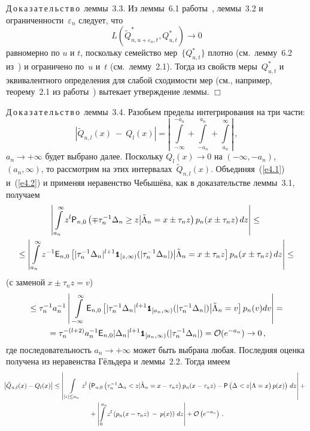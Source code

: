\smallskip

\noindent
Д\,о\,к\,а\,з\,а\,т\,е\,л\,ь\,с\,т\,в\,о~леммы~3.3.
Из леммы~6.1 работы~\cite{8ben}, леммы~3.2 и ограниченности~$\varepsilon_n$ следует, что
$$
L(\tilde Q_{n,u+\varepsilon_n,t}^{*}, Q_{u,t}^{*})\rightarrow 0
$$
равномерно по $u$ и $t$, поскольку семейство мер~$\{ Q_{u,t}^{*} \}$ плотно (см.\ лемму~6.2 из~\cite{2ben}) 
и ограничено по~$u$ и~$t$ (см.\ лемму~2.1). Тогда из свойств меры~$Q_{u,t}^{*}$ и эквивалентного 
определения для слабой сходимости мер (см., например, теорему~2.1 из работы~\cite{9ben}) вытекает утверждение леммы.
\hfill$\Box$

\smallskip

\noindent
Д\,о\,к\,а\,з\,а\,т\,е\,л\,ь\,с\,т\,в\,о~леммы~3.4. Разобьем пределы интегрирования на
три части:
$$
\left|\tilde Q_{n,l}(x)\:-\: Q_{l}(x) \right|=\left|\,\, \int\limits_{-\infty}^{-a_n}+\int\limits_{-a_n}^{a_n}
+\int\limits_{a_n}^{\infty} \right|\,,
$$
$a_n\rightarrow+\infty$ будет выбрано далее. Поскольку $Q_{l}(x)\rightarrow0$ 
на $(-\infty,-a_n)$, $(a_n,\infty)$, то рассмотрим на этих интервалах~$\tilde Q_{n,l}(x)$. 
Объединяя~(\ref{e4.1}) и~(\ref{e4.2}) и применяя неравенство Чебышёва, как в доказательстве леммы~3.1, получаем
\begin{multline*}
\left|\,\int\limits_{a_n}^{\infty} z^{l} {{\sf P}}_{n,0}\left(
\mp\tau_n^{-1}\Delta_n \geq z\big| \tilde\Lambda_n=x\pm\tau_nz\right)p_n(x\pm\tau_nz)\,dz\right|\leq{}
\\
{}
\leq\left|\, \int\limits_{a_n}^{\infty} z^{-1}
{{\sf E}}_{n,0}\left[|\tau_n^{-1}\Delta_n|^{l+1} {\mbox{{\small \tt {1}}\hspace{-1.5mm}{\tt 1}}}_{[z,\infty)}(|\tau_n^{-1}\Delta_n|)
\big| \tilde\Lambda_n=x\pm\tau_nz\right]p_n(x\pm\tau_nz)\,dz\right|\leq{}\\
\end{multline*}
(с заменой $x\pm\tau_nz=v$)
\begin{multline*}
{}\leq\tau_n^{-1}a_n^{-1}\left|\,\, \int\limits_{-\infty}^{\infty}
{{\sf E}}_{n,0}\left[|\tau_n^{-1}\Delta_n|^{l+1} {\mbox{{\small \tt {1}}\hspace{-1.5mm}{\tt 1}}}_{[a_n,\infty)}(|\tau_n^{-1}\Delta_n|)
\big| \tilde\Lambda_n=v\right]p_n(v)dv\right|={}\\
{}=\tau_n^{-(l+2)}a_n^{-1}{{\sf E}}_{n,0}|\Delta_n|^{l+1}{\mbox{{\small \tt {1}}\hspace{-1.5mm}{\tt 1}}}_{[a_n,\infty)}
(|\tau_n^{-1}\Delta_n|)={\cal O}(e^{-a_n})\rightarrow 0\,,
\end{multline*}
где последовательность $a_n\rightarrow+\infty$ может быть выбрана любая. Последняя оценка получена из 
неравенства Гёльдера и леммы~2.2.
Тогда имеем
\begin{multline*}
\!\!\left|\tilde Q_{n,l}(x)- Q_{l}(x) \right|\leq
\left|\, \int\limits_{|z|\leq a_n} z^{l}\left( {{\sf P}}_{n,0}\left(\tau_n^{-1}\Delta_n < 
z\vert \tilde\Lambda_n=x-\tau_nz\right)p_n(x-\tau_nz)-
{{\sf P}}\left(\Delta < z\big| \Lambda=x\right)p(x)\right)\,dz \right|+{}\\
{}
+\left| \int\limits_{0}^{a_n} z^{l}\left( p_n(x-\tau_nz)\:-\:p(x)\right)\,dz \right|+{\cal O}\left(e^{-a_n}\right)\,.
\end{multline*}
